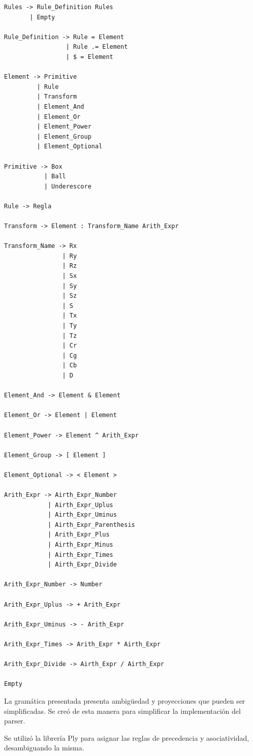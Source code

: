 \documentclass[a4paper, 10pt, twoside]{article}
\begin{document}
\begin{verbatim}
Rules -> Rule_Definition Rules
       | Empty

Rule_Definition -> Rule = Element
                 | Rule .= Element
                 | $ = Element

Element -> Primitive
         | Rule
         | Transform
         | Element_And
         | Element_Or
         | Element_Power
         | Element_Group
         | Element_Optional

Primitive -> Box
           | Ball
           | Underescore

Rule -> Regla

Transform -> Element : Transform_Name Arith_Expr

Transform_Name -> Rx
                | Ry
                | Rz
                | Sx
                | Sy
                | Sz
                | S
                | Tx
                | Ty
                | Tz
                | Cr
                | Cg
                | Cb
                | D

Element_And -> Element & Element

Element_Or -> Element | Element

Element_Power -> Element ^ Arith_Expr

Element_Group -> [ Element ]

Element_Optional -> < Element >

Arith_Expr -> Airth_Expr_Number
            | Airth_Expr_Uplus
            | Airth_Expr_Uminus
            | Airth_Expr_Parenthesis
            | Arith_Expr_Plus
            | Airth_Expr_Minus
            | Airth_Expr_Times
            | Airth_Expr_Divide

Arith_Expr_Number -> Number

Arith_Expr_Uplus -> + Arith_Expr

Arith_Expr_Uminus -> - Arith_Expr

Arith_Expr_Times -> Arith_Expr * Airth_Expr

Arith_Expr_Divide -> Airth_Expr / Airth_Expr

Empty

\end{verbatim}

La gramática presentada presenta ambigüedad y proyecciones que pueden ser simplificadas. Se creó de esta manera para simplificar la implementación del parser.

Se utilizó la librería Ply para asignar las reglas de precedencia y asociatividad, desambiguando la misma.
\end{document}
